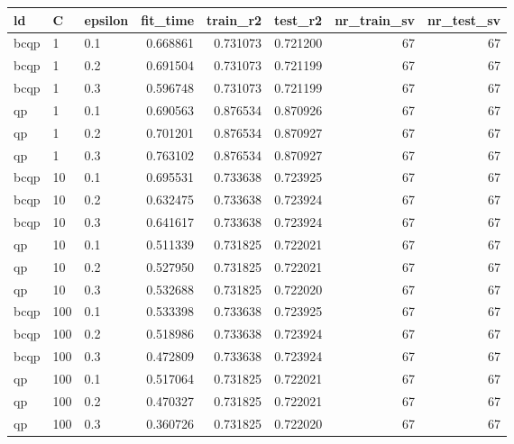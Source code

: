 \begin{tabular}{lllrrrrr}
\toprule
  ld &   C & epsilon &  fit\_time &  train\_r2 &  test\_r2 &  nr\_train\_sv &  nr\_test\_sv \\
\midrule
bcqp &   1 &     0.1 &  0.668861 &  0.731073 & 0.721200 &           67 &          67 \\
bcqp &   1 &     0.2 &  0.691504 &  0.731073 & 0.721199 &           67 &          67 \\
bcqp &   1 &     0.3 &  0.596748 &  0.731073 & 0.721199 &           67 &          67 \\
  qp &   1 &     0.1 &  0.690563 &  0.876534 & 0.870926 &           67 &          67 \\
  qp &   1 &     0.2 &  0.701201 &  0.876534 & 0.870927 &           67 &          67 \\
  qp &   1 &     0.3 &  0.763102 &  0.876534 & 0.870927 &           67 &          67 \\
bcqp &  10 &     0.1 &  0.695531 &  0.733638 & 0.723925 &           67 &          67 \\
bcqp &  10 &     0.2 &  0.632475 &  0.733638 & 0.723924 &           67 &          67 \\
bcqp &  10 &     0.3 &  0.641617 &  0.733638 & 0.723924 &           67 &          67 \\
  qp &  10 &     0.1 &  0.511339 &  0.731825 & 0.722021 &           67 &          67 \\
  qp &  10 &     0.2 &  0.527950 &  0.731825 & 0.722021 &           67 &          67 \\
  qp &  10 &     0.3 &  0.532688 &  0.731825 & 0.722020 &           67 &          67 \\
bcqp & 100 &     0.1 &  0.533398 &  0.733638 & 0.723925 &           67 &          67 \\
bcqp & 100 &     0.2 &  0.518986 &  0.733638 & 0.723924 &           67 &          67 \\
bcqp & 100 &     0.3 &  0.472809 &  0.733638 & 0.723924 &           67 &          67 \\
  qp & 100 &     0.1 &  0.517064 &  0.731825 & 0.722021 &           67 &          67 \\
  qp & 100 &     0.2 &  0.470327 &  0.731825 & 0.722021 &           67 &          67 \\
  qp & 100 &     0.3 &  0.360726 &  0.731825 & 0.722020 &           67 &          67 \\
\bottomrule
\end{tabular}
